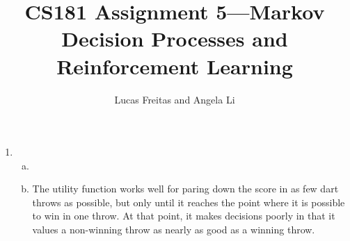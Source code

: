 \documentclass{article}
\title{CS181 Assignment 5---Markov Decision Processes and Reinforcement Learning}
\author{Lucas Freitas and Angela Li}
\begin{document}
\maketitle
    
    \begin{enumerate}
        \item
            \begin{enumerate}[(a)]
                \item %
                \item The utility function works well for paring down the score in as few dart throws as possible, but only until it reaches the point where it is possible to win in one throw. At that point, it makes decisions poorly in that it values a non-winning throw as nearly as good as a winning throw. \\


\end{enumerate}
\end{enumerate}
\end{document}
